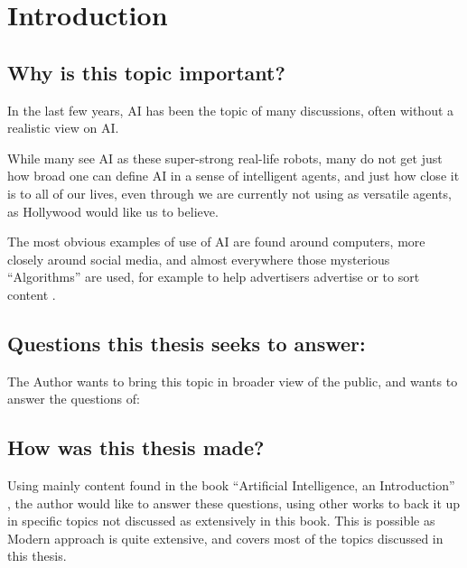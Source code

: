 \chapter{Introduction}
\section{Why is this topic important?}
In the last few years, AI has been the topic of many discussions, often without a realistic view on AI.

While many see AI as these super-strong real-life robots, many do not get just how broad one can define AI in a sense of intelligent agents, and just how close it is to all of our lives, even through we are currently not using as versatile agents, as Hollywood would like us to believe.

The most obvious examples of use of AI are found around computers, more closely around social media, and almost everywhere those mysterious “Algorithms” are used, for example to help advertisers advertise \cite{facebookWerbungAufInstagram} or to sort content \cite{googleFunktioniertGoogleSucheSuchalgorithmen}.
\section{Questions this thesis seeks to answer:}
The Author wants to bring this topic in broader view of the public, and wants to answer the questions of: 
\section{How was this thesis made?}
Using mainly content found in the book “Artificial Intelligence, an Introduction” \cite{russellArtificialIntelligenceModern2010}, the author would like to answer these questions, using other works to back it up in specific topics not discussed as extensively in this book. This is possible as Modern approach is quite extensive, and covers most of the topics discussed in this thesis.